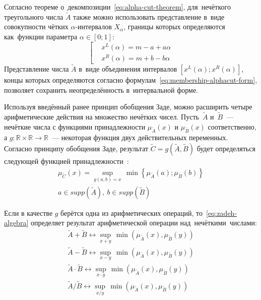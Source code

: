 Согласно теореме о~декомпозиции~\eqref{eq:alpha-cut-theorem}, для~нечёткого треугольного числа $\tilde{A}$ также можно использовать представление в~виде совокупности чётких $\alpha$-интервалов $X_\alpha$, границы которых определяются как~функции параметра $\alpha \in \left[ 0;1 \right]$:
\begin{equation}
\label{eq:membership-alphacut-form}
	\left[ 
		\begin{aligned}
			& {{x}^{L}}(\alpha )=m-a+a\alpha  \\ 
			& {{x}^{R}}(\alpha )=m+b-b\alpha
		 \end{aligned}
	\right.
\end{equation}
Представление числа $\tilde{A}$ в~виде объединения интервалов $\left[ {{x}^{L}}\left( \alpha  \right);{{x}^{R}}\left( \alpha  \right) \right]$, концы которых определяются согласно формулам~\eqref{eq:membership-alphacut-form}, позволяет сохранить неопределённость в~интервальной форме.

Используя введённый ранее принцип обобщения Заде, можно расширить четыре арифметические действия на множество нечётких чисел. Пусть~$\tilde{A}$ и~$\tilde{B}$~--- нечёткие числа с функциями принадлежности $\mu_{\tilde A}\left( x \right)$ и $\mu_{\tilde B}\left( x \right)$ соответственно, а $g:\mathbb{R}\times \mathbb{R}\to \mathbb{R}$~--- некоторая функция двух действительных переменных. Согласно принципу обобщения Заде, результат $\tilde{C}=g\left( \tilde{A},\tilde{B} \right)$ будет определяться следующей функцией принадлежности~\cite{Borisov_Alexeev_Msk, Pospelov, Rutkovskaya, Yakhyaeva}:
\begin{equation}
\label{eq:zadeh-algebra}
	\begin{matrix}
		\mu_{\tilde C}\left( x \right)=\underset{g\left( a,b \right)=x}{\mathop{\sup }}{}\,\min \left\{ {{\mu }_{{\tilde{A}}}}\left( a \right);{{\mu }_{{\tilde{B}}}}\left( b \right) \right\} \\ 
		  a\in supp\left( {\tilde{A}} \right),\ b\in supp\left( {\tilde{B}} \right) 
	\end{matrix}
\end{equation}

Если в качестве $g$ берётся одна из арифметических операций, то~\eqref{eq:zadeh-algebra} определяет результат арифметической операции над~нечёткими~числами:
\begin{gather*}
		\tilde{A}+\tilde{B} \leftrightarrow \underset{x+y}{\mathop{\sup }}\,\min \left( {{\mu }_{{\tilde{A}}}}\left( x \right),{{\mu }_{{\tilde{B}}}}\left( y \right) \right) \\
		\tilde{A}-\tilde{B} \leftrightarrow \underset{x-y}{\mathop{\sup }}\,\min \left( {{\mu }_{{\tilde{A}}}}\left( x \right),{{\mu }_{{\tilde{B}}}}\left( y \right) \right) \\
		\tilde{A}\cdot \tilde{B} \leftrightarrow \underset{x\cdot y}{\mathop{\sup }}\,\min \left( {{\mu }_{{\tilde{A}}}}\left( x \right),{{\mu }_{{\tilde{B}}}}\left( y \right) \right) \\
		\tilde{A}/\tilde{B} \leftrightarrow \underset{x/y}{\mathop{\sup }}\,\min \left( \mu_{\tilde A}\left( x \right), \mu_{\tilde B} \left( y \right) \right) 
\end{gather*}

